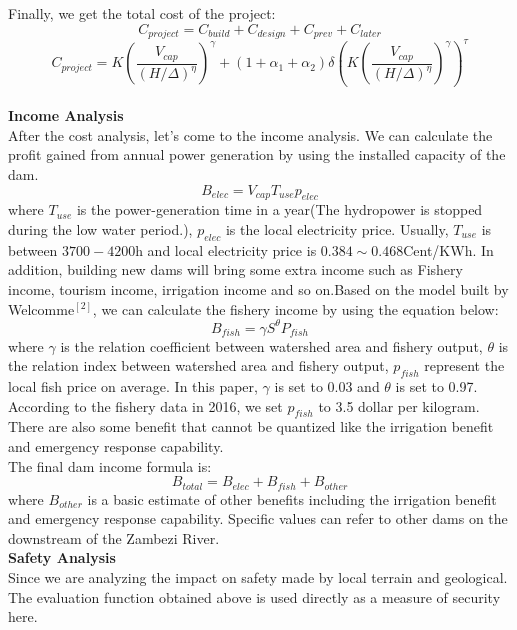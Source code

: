 \documentclass{mcmthesis}
\begin{document}
Finally, we get the total cost of the project:
\begin{equation}
C_{project} = C_{build} + C_{design} + C_{prev} + C_{later}
\end{equation}
\begin{equation}
C_{project} = K(\frac{V_{cap}}{(H/\Delta)^{\eta}})^{\gamma} + (1+\alpha_{1}+\alpha_{2}){\delta}(K(\frac{V_{cap}}{(H/\Delta)^{\eta}})^{\gamma})^{\tau}
\end{equation}\\
\textbf{Income Analysis}\\
\indent After the cost analysis, let's come to the income analysis. We can calculate the profit gained from annual power generation by using the installed capacity of the dam. 
\begin{equation}
B_{elec} = V_{cap}T_{use}p_{elec}
\end{equation}
where $T_{use}$ is the power-generation time in a year(The hydropower is stopped during the low water period.),  $p_{elec}$ is the local electricity price. Usually, $T_{use}$ is between $3700-4200$h and local electricity price is $0.384\sim0.468$Cent/KWh.
In addition, building new dams will bring some extra income such as Fishery income, tourism income, irrigation income and so on.Based on the model built by Welcomme$^{[2]}$, we can calculate the fishery income by using the equation below:
\begin{equation}
B_{fish} = {\gamma}S^{\theta}P_{fish}
\end{equation}
where $\gamma$ is the relation coefficient between watershed area and fishery output, $\theta$ is the relation index between watershed area and fishery output, $p_{fish}$ represent the local fish price on average. In this paper, $\gamma$ is set to 0.03 and $\theta$ is set to 0.97. According to the fishery data in 2016, we set $p_{fish}$ to 3.5 dollar per kilogram. There are also some benefit that cannot be quantized like the irrigation benefit and emergency response capability. \\
The final dam income formula is:
\begin{equation}
B_{total} = B_{elec} + B_{fish} + B_{other}
\end{equation}
where $B_{other}$ is a basic estimate of other benefits including the irrigation benefit and emergency response capability. Specific values can refer to other dams on the downstream of the Zambezi River.\\
\textbf{Safety Analysis}\\
\indent Since we are analyzing the impact on safety made by local terrain and geological. The evaluation function obtained above is used directly as a measure of security here.
\end{document}
